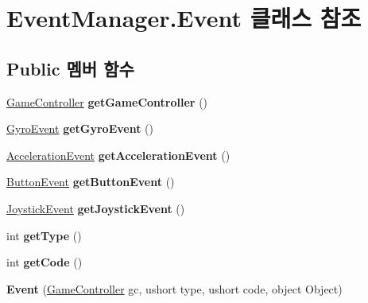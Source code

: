 \hypertarget{class_event_manager_1_1_event}{}\section{Event\+Manager.\+Event 클래스 참조}
\label{class_event_manager_1_1_event}
\subsection*{Public 멤버 함수}
\begin{DoxyCompactItemize}
\item 
\hypertarget{class_event_manager_1_1_event_a9d51b34eef1234efc07ee484d68747ef}{}\hyperlink{class_game_controller}{Game\+Controller} {\bfseries get\+Game\+Controller} ()\label{class_event_manager_1_1_event_a9d51b34eef1234efc07ee484d68747ef}

\item 
\hypertarget{class_event_manager_1_1_event_afbf072b1da0d9e1823b72358fac58737}{}\hyperlink{class_event_manager_1_1_gyro_event}{Gyro\+Event} {\bfseries get\+Gyro\+Event} ()\label{class_event_manager_1_1_event_afbf072b1da0d9e1823b72358fac58737}

\item 
\hypertarget{class_event_manager_1_1_event_ae298c4a24ed673ca9a97c7d254089e7d}{}\hyperlink{class_event_manager_1_1_acceleration_event}{Acceleration\+Event} {\bfseries get\+Acceleration\+Event} ()\label{class_event_manager_1_1_event_ae298c4a24ed673ca9a97c7d254089e7d}

\item 
\hypertarget{class_event_manager_1_1_event_ae41c50157988cb2e2fc03dfced1cdbb0}{}\hyperlink{class_event_manager_1_1_button_event}{Button\+Event} {\bfseries get\+Button\+Event} ()\label{class_event_manager_1_1_event_ae41c50157988cb2e2fc03dfced1cdbb0}

\item 
\hypertarget{class_event_manager_1_1_event_a591b60a8a46cbe09f3aed1d2a22f30c4}{}\hyperlink{class_event_manager_1_1_joystick_event}{Joystick\+Event} {\bfseries get\+Joystick\+Event} ()\label{class_event_manager_1_1_event_a591b60a8a46cbe09f3aed1d2a22f30c4}

\item 
\hypertarget{class_event_manager_1_1_event_a2f784c90574c5a38a368ef54f5608c6f}{}int {\bfseries get\+Type} ()\label{class_event_manager_1_1_event_a2f784c90574c5a38a368ef54f5608c6f}

\item 
\hypertarget{class_event_manager_1_1_event_a3ab2d15f757b446834086ef045944d95}{}int {\bfseries get\+Code} ()\label{class_event_manager_1_1_event_a3ab2d15f757b446834086ef045944d95}

\item 
\hypertarget{class_event_manager_1_1_event_add1157dbe3d2939aa9ba5fbcf42cf14c}{}{\bfseries Event} (\hyperlink{class_game_controller}{Game\+Controller} gc, ushort type, ushort code, object Object)\label{class_event_manager_1_1_event_add1157dbe3d2939aa9ba5fbcf42cf14c}

\end{DoxyCompactItemize}


